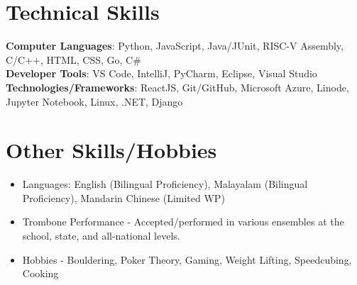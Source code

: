 \documentclass[letterpaper,11pt]{article}
\begin{document}
%
\section{Technical Skills}
 \begin{itemize}[leftmargin=0.15in, label={}]
    \small{\item{
      \textbf{Computer Languages}{: Python, JavaScript, Java/JUnit, RISC-V Assembly, C/C++, HTML, CSS, Go, C\#} \\
      \textbf{Developer Tools}{: VS Code, IntelliJ, PyCharm, Eclipse, Visual Studio} \\
     \textbf{Technologies/Frameworks}{: ReactJS, Git/GitHub, Microsoft Azure, Linode, Jupyter Notebook, Linux, .NET, Django} \\
    }}

 \end{itemize}
 \vspace{-10pt}
 
 

\section{Other Skills/Hobbies}

    \begin{itemize}
      
      \setlength\itemsep{-1pt}
      \item\small{Languages: English (Bilingual Proficiency), Malayalam (Bilingual Proficiency), Mandarin Chinese (Limited WP)}
      \item{Trombone Performance - Accepted/performed in various ensembles at the school, state, and all-national levels.}
      \item{Hobbies - Bouldering, Poker Theory, Gaming, Weight Lifting, Speedcubing, Cooking }
    \end{itemize}
                
\end{document}
